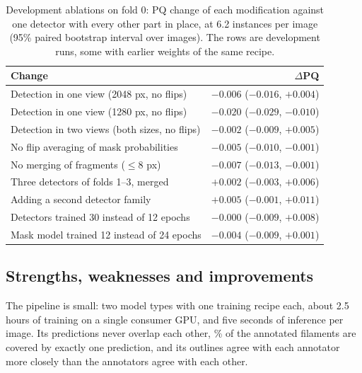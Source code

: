 \documentclass[sigconf,nonacm]{acmart}
\begin{document}
\begin{table}[t]
  \caption{Development ablations on fold 0: PQ change of each modification against one detector with every other part in place, at 6.2 instances per image (95\% paired bootstrap interval over images). The rows are development runs, some with earlier weights of the same recipe.}
  \label{tab:ablation}
  \small
  \begin{tabular}{@{}lr@{}}
    \toprule
    Change & $\Delta$PQ \\
    \midrule
    Detection in one view (2048 px, no flips) & $-0.006$ ($-0.016$, $+0.004$) \\
    Detection in one view (1280 px, no flips) & $-0.020$ ($-0.029$, $-0.010$) \\
    Detection in two views (both sizes, no flips) & $-0.002$ ($-0.009$, $+0.005$) \\
    No flip averaging of mask probabilities & $-0.005$ ($-0.010$, $-0.001$) \\
    No merging of fragments ($\le8$ px) & $-0.007$ ($-0.013$, $-0.001$) \\
    Three detectors of folds 1--3, merged & $+0.002$ ($-0.003$, $+0.006$) \\
    Adding a second detector family & $+0.005$ ($-0.001$, $+0.011$) \\
    Detectors trained 30 instead of 12 epochs & $-0.000$ ($-0.009$, $+0.008$) \\
    Mask model trained 12 instead of 24 epochs & $-0.004$ ($-0.009$, $+0.001$) \\
    \bottomrule
  \end{tabular}
\end{table}

\subsection{Strengths, weaknesses and improvements}
    The pipeline is small: two model types with one training recipe each, about 2.5 hours of training on a single consumer GPU, and five seconds of inference per image. Its predictions never overlap each other, \agTruthOne\% of the annotated filaments are covered by exactly one prediction, and its outlines agree with each annotator more closely than the annotators agree with each other.
\end{document}
